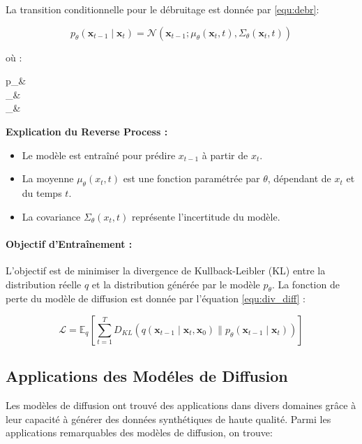 La transition conditionnelle pour le débruitage est donnée par \ref{equ:debr}:

\begin{equation}
	p_\theta(\mathbf{x}_{t-1} \mid \mathbf{x}_t) = \mathcal{N}(\mathbf{x}_{t-1}; \mu_\theta(\mathbf{x}_t, t), \Sigma_\theta(\mathbf{x}_t, t))
	\label{equ:debr}
\end{equation}

où :
\begin{conditions}
	p_\theta &  \\
	\mu_\theta &  \\
	\Sigma_\theta & 
\end{conditions}

\textbf{Explication du Reverse Process :}

\begin{itemize}
	\item Le modèle est entraîné pour prédire \( x_{t-1} \) à partir de \( x_t \).
	\item La moyenne \( \mu_\theta(x_t, t) \) est une fonction paramétrée par \( \theta
	      \), dépendant de \( x_t \) et du temps \( t \).
	\item La covariance \( \Sigma_\theta(x_t, t) \) représente l'incertitude du modèle.
\end{itemize}

\paragraph{Objectif d'Entraînement :}
L'objectif est de minimiser la divergence de Kullback-Leibler (KL) entre la
distribution réelle \( q \) et la distribution générée par le modèle \(
p_\theta \). La fonction de perte du modèle de diffusion est donnée par
l'équation \ref{equ:div_diff} :

\begin{equation}
	\mathcal{L} = \mathbb{E}_q \left[ \sum_{t=1}^T D_{KL}(q(\mathbf{x}_{t-1} \mid \mathbf{x}_t, \mathbf{x}_0) \| p_\theta(\mathbf{x}_{t-1} \mid \mathbf{x}_t)) \right]
	\label{equ:div_diff}
\end{equation}

\subsection{Applications des Modéles de Diffusion}
Les modèles de diffusion ont trouvé des applications dans divers domaines grâce
à leur capacité à générer des données synthétiques de haute qualité. Parmi les
applications remarquables des modèles de diffusion, on trouve:

